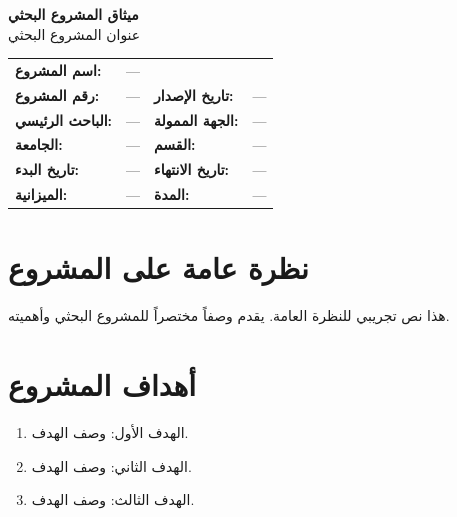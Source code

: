 \documentclass[11pt,a4paper]{article}
\begin{document}
\begin{center}
{\LARGE\bfseries ميثاق المشروع البحثي}\\[0.5em]
{\Large عنوان المشروع البحثي}\\[1em]
\end{center}

\begin{table}[H]
\centering
\renewcommand{\arraystretch}{1.4}
\begin{tabularx}{\textwidth}{L{4cm} X L{4cm} X}
\toprule
\textbf{اسم المشروع:} &  \\
\textbf{رقم المشروع:} & --- & \textbf{تاريخ الإصدار:} & --- \\
\textbf{الباحث الرئيسي:} & --- & \textbf{الجهة الممولة:} & --- \\
\textbf{الجامعة:} & --- & \textbf{القسم:} & --- \\
\textbf{تاريخ البدء:} & --- & \textbf{تاريخ الانتهاء:} & --- \\
\textbf{الميزانية:} & --- & \textbf{المدة:} & --- \\
\bottomrule
\end{tabularx}
\end{table}

\vspace{1em}

\section{نظرة عامة على المشروع}
\label{sec:overview}

هذا نص تجريبي للنظرة العامة. يقدم وصفاً مختصراً للمشروع البحثي وأهميته.

\section{أهداف المشروع}
\label{sec:objectives}

\begin{enumerate}
    \item الهدف الأول: وصف الهدف.
    \item الهدف الثاني: وصف الهدف.
    \item الهدف الثالث: وصف الهدف.
\end{enumerate}
\end{document}

